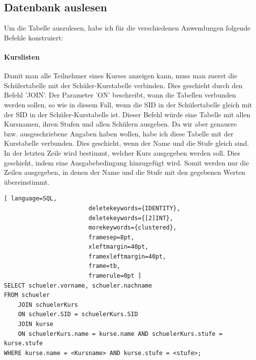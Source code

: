 \documentclass[a4paper, 12pt]{article}
\theoremstyle{plain}
\theoremstyle{definition}
\begin{document}
	\subsection{Datenbank auslesen}
	Um die Tabelle auszulesen, habe ich für die verschiedenen Anwendungen folgende Befehle konstruiert:
	\paragraph{Kurslisten} \label{sec:selKursLi} Damit man alle Teilnehmer eines Kurses anzeigen kann, muss man zuerst die Schülertabelle mit der Schüler-Kurstabelle verbinden. Dies geschieht durch den Befehl 'JOIN'. Der Parameter 'ON' beschreibt, wann die Tabellen verbunden werden sollen, so wie in diesem Fall, wenn die SID in der Schülertabelle gleich mit der SID in der Schüler-Kurstabelle ist. Dieser Befehl würde eine Tabelle mit allen Kursnamen, ihren Stufen und allen Schülern ausgeben. Da wir aber genauere bzw. ausgeschriebene Angaben haben wollen, habe ich diese Tabelle mit der Kurstabelle verbunden. Dies geschieht, wenn der Name  und die Stufe gleich sind. In der letzten Zeile wird bestimmt, welcher Kurs ausgegeben werden soll. Dies geschieht, indem eine Ausgabebedingung hinzugefügt wird. Somit werden nur die Zeilen ausgegeben, in denen der Name und die Stufe mit den gegebenen Werten übereinstimmt. 
	\begin{lstlisting}[ language=SQL,
	                    deletekeywords={IDENTITY},
	                    deletekeywords={[2]INT},
	                    morekeywords={clustered},
	                    framesep=8pt,
	                    xleftmargin=40pt,
	                    framexleftmargin=40pt,
	                    frame=tb,
	                    framerule=0pt ]	
SELECT schueler.vorname, schueler.nachname
FROM schueler
	JOIN schuelerKurs
	ON schueler.SID = schuelerKurs.SID
	JOIN kurse
	ON schuelerKurs.name = kurse.name AND schuelerKurs.stufe = kurse.stufe
WHERE kurse.name = <Kursname> AND kurse.stufe = <stufe>;\end{lstlisting}	
\end{document}
